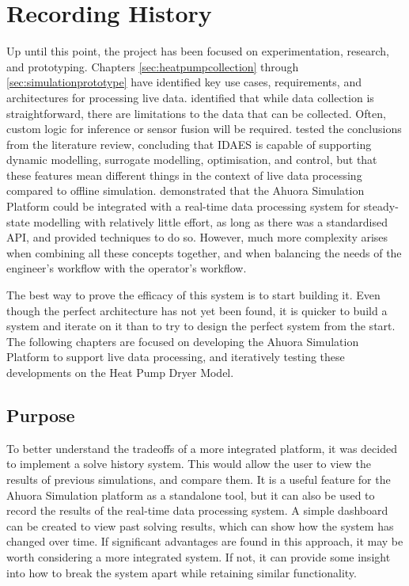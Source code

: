 \chapter{Recording History} \label{sec:history}

Up until this point, the project has been focused on experimentation, research, and prototyping. Chapters \ref{sec:heatpumpcollection} through \ref{sec:simulationprototype} have identified key use cases, requirements, and architectures for processing live data. 
 identified that while data collection is straightforward, there are limitations to the data that can be collected. Often, custom logic for inference or sensor fusion will be required.  tested the conclusions from the literature review, concluding that IDAES is capable of supporting dynamic modelling, surrogate modelling, optimisation, and control, but that these features mean different things in the context of live data processing compared to offline simulation.  demonstrated that the Ahuora Simulation Platform could be integrated with a real-time data processing system for steady-state modelling with relatively little effort, as long as there was a standardised API, and provided techniques to do so. However, much more complexity arises when combining all these concepts together, and when balancing the needs of the engineer's workflow with the operator's workflow.

The best way to prove the efficacy of this system is to start building it. Even though the perfect architecture has not yet been found, it is quicker to build a system and iterate on it than to try to design the perfect system from the start. The following chapters are focused on developing the Ahuora Simulation Platform to support live data processing, and iteratively testing these developments on the Heat Pump Dryer Model.

\section{Purpose}

To better understand the tradeoffs of a more integrated platform, it was decided to implement a solve history system. This would allow the user to view the results of previous simulations, and compare them. It is a useful feature for the Ahuora Simulation platform as a standalone tool, but it can also be used to record the results of the real-time data processing system. A simple dashboard can be created to view past solving results, which can show how the system has changed over time. If significant advantages are found in this approach, it may be worth considering a more integrated system. If not, it can provide some insight into how to break the system apart while retaining similar functionality.


